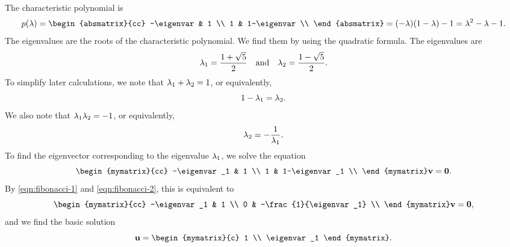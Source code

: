 \begin{solution}
  The characteristic polynomial is
  \begin{equation*}
    p(\eigenvar) =
    \begin{absmatrix}{cc}
      -\eigenvar & 1 \\
      1 & 1-\eigenvar \\
    \end{absmatrix}
    = (-\eigenvar)(1-\eigenvar) - 1
    = \eigenvar^2 - \eigenvar - 1.
  \end{equation*}
  The eigenvalues are the roots of the characteristic polynomial. We
  find them by using the quadratic formula. The eigenvalues are
  \begin{equation*}
    \lambda_1 = \frac{1+\sqrt{5}}{2}
    \quad\mbox{and}\quad
    \lambda_2 = \frac{1-\sqrt{5}}{2}.
  \end{equation*}
  To simplify later calculations, we note that
  $\lambda_1+\lambda_2 = 1$, or equivalently,
  \begin{equation}\label{eqn:fibonacci-1}
    1-\lambda_1 = \lambda_2.
  \end{equation}
  We also note that
  $\lambda_1\lambda_2 = -1$, or equivalently,
  \begin{equation}\label{eqn:fibonacci-2}
    \lambda_2 = -\frac{1}{\lambda_1}.
  \end{equation}
  To find the eigenvector corresponding to the eigenvalue $\lambda_1$,
  we solve the equation
  \begin{equation*}
    \begin{mymatrix}{cc}
      -\eigenvar_1 & 1 \\
      1 & 1-\eigenvar_1 \\
    \end{mymatrix}
    \vect{v} = \vect{0}.
  \end{equation*}
  By {\eqref{eqn:fibonacci-1}} and {\eqref{eqn:fibonacci-2}}, this is
  equivalent to
  \begin{equation*}
    \begin{mymatrix}{cc}
      -\eigenvar_1 & 1 \\
      0 & -\frac{1}{\eigenvar_1} \\
    \end{mymatrix}
    \vect{v} = \vect{0},
  \end{equation*}
  and we find the basic solution
  \begin{equation*}
    \vect{u} = \begin{mymatrix}{c} 1 \\ \eigenvar_1 \end{mymatrix}.

\end{equation*}
\end{solution}
